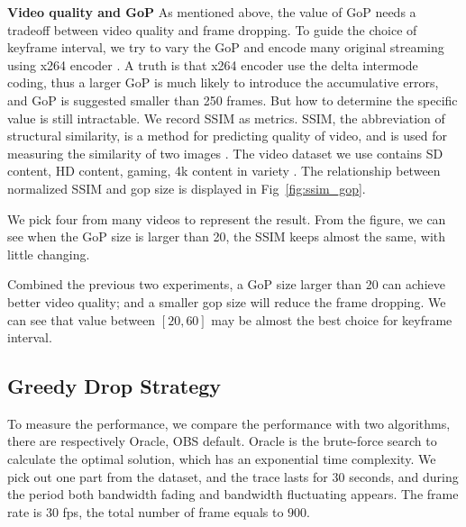 
\textbf{Video quality and GoP} As mentioned above, the value of GoP needs a tradeoff between video quality and frame dropping. To guide the choice of keyframe interval, we try to vary the GoP and encode many original streaming using x264 encoder \cite{x264}. A truth is that x264 encoder use the delta intermode coding, thus a larger GoP is much likely to introduce the accumulative errors, and GoP is suggested smaller than 250 frames. But how to determine the specific value is still intractable. We record SSIM as metrics. SSIM, the abbreviation of structural similarity, is a method for predicting quality of video, and is used for measuring the similarity of two images \cite{wang2004image}. The video dataset we use contains SD content, HD content, gaming, 4k content in variety \cite{video_dataset}. The relationship between normalized SSIM and gop size is displayed in Fig~\ref{fig:ssim_gop}.

We pick four from many videos to represent the result. From the figure, we can see when the GoP size is larger than 20, the SSIM keeps almost the same, with little changing.

Combined the previous two experiments, a GoP size larger than 20 can achieve better video quality; and a smaller gop size will reduce the frame dropping. We can see that value between $[20,60]$ may be almost the best choice for keyframe interval.

\iffalse

\textbf{Varying bitrate.}
To make the conclusion more visible, we fix key frame interval to be 8s and introduce network interruption between 19s and 21s. In different experiments, we provide sufficient network bandwidth and vary the bitrate to be 1000kbps, 1500kbps, 2000kbps, and 2500kbps. The frame drop is shown in Table~\ref{tab:bitrate}. The different bitrates do not make much difference, the number of drop in all cases is about 149.

\textbf{Summary.} We summarize and get conclusions. First, reducing keyframe interval leads to less frame drop. Second, bitrate does not influence frame drop for the short-term case, but the quality of each picture. Preliminary Evaluation points out that a small GoP is one useful try.
\fi

\subsection{Greedy Drop Strategy}
To measure the performance, we compare the performance with two algorithms, there are respectively Oracle, OBS default. Oracle is the brute-force search to calculate the optimal solution, which has an exponential time complexity. We pick out one part from the dataset, and the trace lasts for $30$ seconds, and during the period both bandwidth fading and bandwidth fluctuating appears. The frame rate is $30$ fps, the total number of frame equals to $900$.

